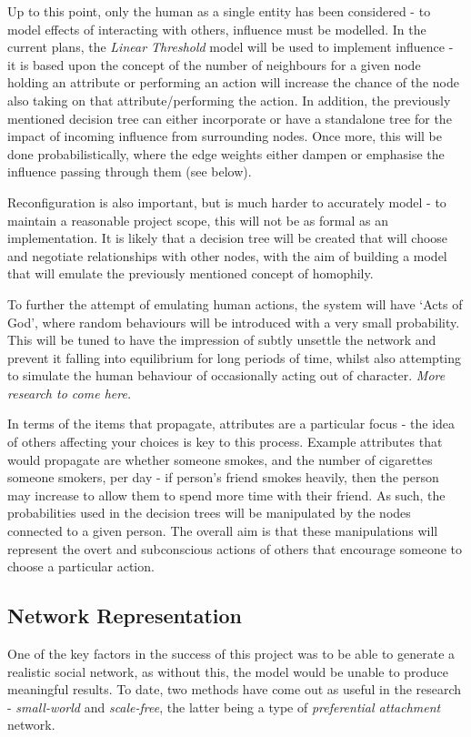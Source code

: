 \documentclass[]{article}
\begin{document}
Up to this point, only the human as a single entity has been considered - to model effects of interacting with others, influence must be modelled. In the current plans, the \emph{Linear Threshold} model will be used to implement influence - it is based upon the concept of the number of neighbours for a given node holding an attribute or performing an action will increase the chance of the node also taking on that attribute/performing the action. In addition, the previously mentioned decision tree can either incorporate or have a standalone tree for the impact of incoming influence from surrounding nodes. Once more, this will be done probabilistically, where the edge weights either dampen or emphasise the influence passing through them (see below). 

Reconfiguration is also important, but is much harder to accurately model - to maintain a reasonable project scope, this will not be as formal as an implementation. It is likely that a decision tree will be created that will choose and negotiate relationships with other nodes, with the aim of building a model that will emulate the previously mentioned concept of homophily.

To further the attempt of emulating human actions, the system will have `Acts of God', where random behaviours will be introduced with a very small probability. This will be tuned to have the impression of subtly unsettle the network and prevent it falling into equilibrium for long periods of time, whilst also attempting to simulate the human behaviour of occasionally acting out of character. \emph{More research to come here.}

In terms of the items that propagate, attributes are a particular focus - the idea of others affecting your choices is key to this process. Example attributes that would propagate are whether someone smokes, and the number of cigarettes someone smokers, per day - if person's friend smokes heavily, then the person may increase to allow them to spend more time with their friend. As such, the probabilities used in the decision trees will be manipulated by the nodes connected to a given person. The overall aim is that these manipulations will represent the overt and subconscious actions of others that encourage someone to choose a particular action.

\subsection{Network Representation}
One of the key factors in the success of this project was to be able to generate a realistic social network, as without this, the model would be unable to produce meaningful results. To date, two methods have come out as useful in the research - \emph{small-world} and \emph{scale-free}, the latter being a type of \emph{preferential attachment} network.
\end{document}

